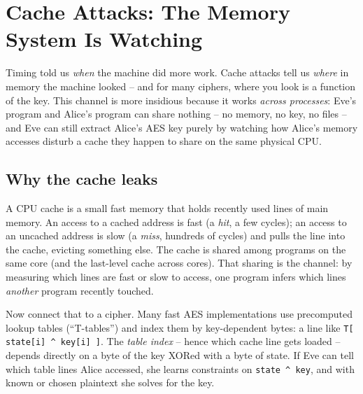 \section{Cache Attacks: The Memory System Is Watching}
\label{ch37:cache}

Timing told us \emph{when} the machine did more work. Cache attacks tell us \emph{where} in memory the machine looked -- and for many ciphers, where you look is a function of the key. This channel is more insidious because it works \emph{across processes}: Eve's program and Alice's program can share nothing -- no memory, no key, no files -- and Eve can still extract Alice's AES key purely by watching how Alice's memory accesses disturb a cache they happen to share on the same physical CPU.

\subsection{Why the cache leaks}
\label{ch37:why-cache}

A CPU cache is a small fast memory that holds recently used lines of main memory. An access to a cached address is fast (a \emph{hit}, a few cycles); an access to an uncached address is slow (a \emph{miss}, hundreds of cycles) and pulls the line into the cache, evicting something else. The cache is shared among programs on the same core (and the last-level cache across cores). That sharing is the channel: by measuring which lines are fast or slow to access, one program infers which lines \emph{another} program recently touched.

Now connect that to a cipher. Many fast AES implementations use precomputed lookup tables (``T-tables'') and index them by key-dependent bytes: a line like \texttt{T[ state[i] \^{} key[i] ]}. The \emph{table index} -- hence which cache line gets loaded -- depends directly on a byte of the key XORed with a byte of state. If Eve can tell which table lines Alice accessed, she learns constraints on \texttt{state \^{} key}, and with known or chosen plaintext she solves for the key.

